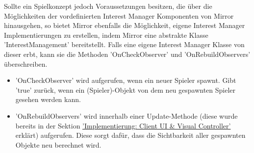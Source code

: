 Sollte ein Spielkonzept jedoch Voraussetzungen besitzen, die über die Möglichkeiten der vordefinierten Interest Manager Komponenten von Mirror hinausgehen, so bietet Mirror ebenfalls die Möglichkeit, eigene Interest Manager Implementierungen zu erstellen, indem Mirror eine abstrakte Klasse 'InterestManagement' bereitstellt. Falls eine eigene Interest Manager Klasse von dieser erbt, kann sie die Methoden 'OnCheckObserver' und 'OnRebuildObservers' überschreiben. \cite{.17.02.2022c}

\begin{itemize}
	\item 'OnCheckObserver' wird aufgerufen, wenn ein neuer Spieler spawnt. Gibt 'true' zurück, wenn ein (Spieler)-Objekt von dem neu gespawnten Spieler gesehen werden kann.
	\item 'OnRebuildObservers' wird innerhalb einer Update-Methode (diese wurde bereits in der Sektion \hyperref[implementierung:client_UI_Controller]{'Implementierung: Client UI \& Visual Controller'} erklärt) aufgerufen. Diese sorgt dafür, dass die Sichtbarkeit aller gespawnten Objekte neu berechnet wird.
\end{itemize}